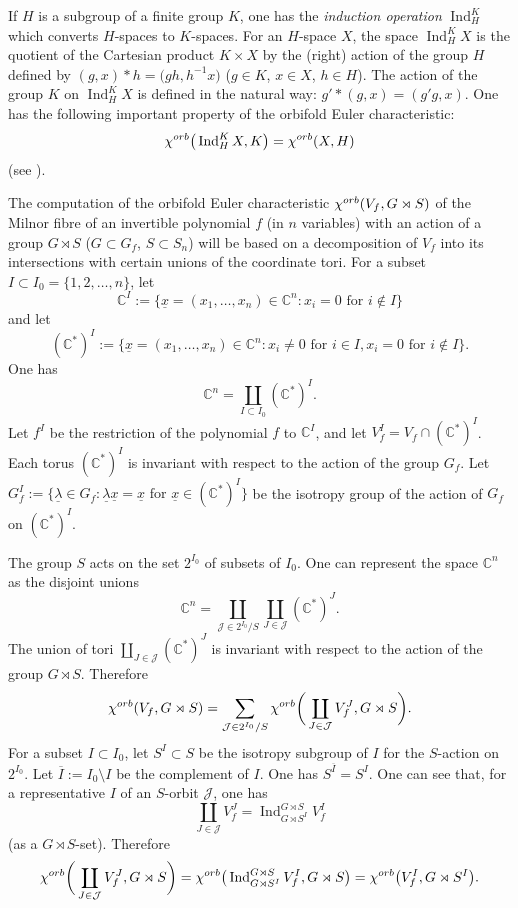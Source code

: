 \documentclass[11pt]{article}
\numberwithin{equation}{section}
\numberwithin{equation}{section}
\begin{document}
If $H$ is a subgroup of a finite group $K$, one has the {\em induction operation} $\operatorname{Ind}_H^K$ which converts $H$-spaces to $K$-spaces. For an $H$-space $X$, the space $\operatorname{Ind}_H^K X$ is the quotient of the Cartesian product $K\times X$ by the (right) action of the group $H$ defined by $(g,x)*h=\big(gh, h^{-1}x\big)$ ($g\in K$, $x\in X$, $h\in H$). The action of the group $K$ on $\operatorname{Ind}_H^K X$ is defined in the natural way: $g'*(g,x)=(g'g,x)$. One has the following important property of the orbifold Euler characteristic:
\[
{\chi}^{\rm orb}\big(\operatorname{Ind}_H^K X, K\big)={\chi}^{\rm orb}(X, H)
\]
(see \cite[Theorem~1]{GLM}).

The computation of the orbifold Euler characteristic ${\chi}^{\rm orb}(V_f, G \rtimes S)$ of the Milnor fibre of an invertible polynomial $f$ (in $n$ variables) with an action of a group $G\rtimes S$ ($G\subset G_f$, $S\subset S_n$) will be based on a decomposition of $V_f$ into its intersections with certain unions of the coordinate tori. For a subset $I\subset I_0=\{1, 2, \dots, n\}$, let
\[
{\mathbb C}^I:=\big\{\underline{x}=(x_1, \dots, x_n)\in {\mathbb C}^n\colon x_i=0 \text{ for }i\notin I\big\}
\]
and let
\[
({\mathbb C}^*)^I:=\big\{\underline{x}=(x_1, \dots, x_n)\in {\mathbb C}^n\colon x_i\neq 0 \text{ for }i\in I, x_i=0 \text{ for }i\notin I\big\} .
\]
One has
\[
{\mathbb C}^n=\coprod_{I\subset I_0} ({\mathbb C}^*)^I.
\]
Let $f^I$ be the restriction of the polynomial $f$ to ${\mathbb C}^I$, and let $V_f^I=V_f \cap ({\mathbb C}^*)^I$.
Each torus $({\mathbb C}^\ast)^I$ is invariant with respect to the action of the group $G_f$.
Let $G_f^I:=\big\{ \underline{\lambda} \in G_f \colon \underline{\lambda} \underline{x} =
\underline{x} \mbox{ for } \underline{x} \in ({\mathbb C}^\ast)^I \big\}$ be the isotropy group of the action of $G_f$ on $({\mathbb C}^\ast)^I$.

The group $S$ acts on the set $2^{I_0}$ of subsets of $I_0$. One can represent the space ${\mathbb C}^n$ as the disjoint unions
\[
{\mathbb C}^n=\coprod_{{\mathcal J}\in 2^{I_0}/S}\coprod_{J\in{\mathcal J}}({\mathbb C}^*)^J.
\]
The union of tori $\coprod_{J\in{\mathcal J}}({\mathbb C}^*)^J$ is invariant with respect to the action of the group $G \rtimes S$. Therefore
\[
{\chi}^{\rm orb}(V_f, G \rtimes S)=\sum_{{\mathcal J}\in 2^{I_0}/S}{\chi}^{\rm orb}\bigg(\coprod_{J\in{\mathcal J}}V_f^J, G \rtimes S\bigg) .
\]
For a subset $I\subset I_0$, let $S^I\subset S$ be the isotropy subgroup of $I$ for the $S$-action on $2^{I_0}$. Let $\overline{I} := I_0 \setminus I$ be the complement of $I$. One has $S^{\overline{I}}=S^I$.
One can see that, for a representative $I$ of an $S$-orbit ${\mathcal J}$, one has
\[
\coprod_{J\in{\mathcal J}}V_f^J=\operatorname{Ind}_{G\rtimes S^I}^{G\rtimes S} V_f^I
\]
(as a $G\rtimes S$-set). Therefore
\[
{\chi}^{\rm orb}\bigg(\coprod_{J\in{\mathcal J}}V_f^J,G \rtimes S\bigg)=
{\chi}^{\rm orb}\big(\operatorname{Ind}_{G\rtimes S^I}^{G\rtimes S} V_f^I, G\rtimes S\big)=
{\chi}^{\rm orb}\big(V_f^I, G\rtimes S^I\big).
\]
\end{document}
